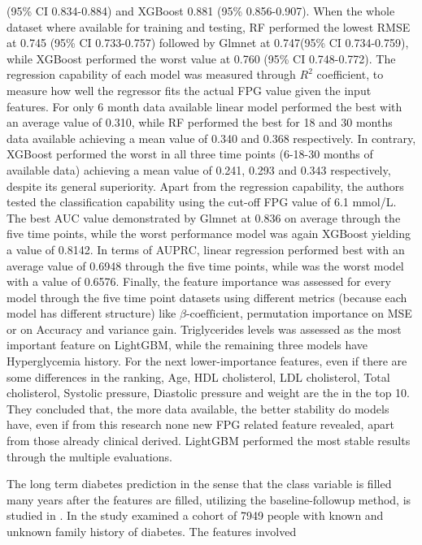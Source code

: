 \documentclass[journal,article,submit,pdftex,moreauthors]{Definitions/mdpi}
\begin{document}
(95\% CI 0.834-0.884) and XGBoost 0.881 (95\% 0.856-0.907). When the whole dataset
where available for training and testing, RF performed the lowest RMSE at 0.745 
(95\% CI 0.733-0.757) followed by Glmnet at 0.747(95\% CI 0.734-0.759), while 
XGBoost performed the worst value at 0.760 (95\% CI 0.748-0.772). The regression 
capability of each model was measured through $R^{2}$ coefficient, to measure how
well the regressor fits the actual FPG value given the input features. For only 6 
month data available linear model performed the best with an average value of 
0.310, while RF performed the best for 18 and 30 months data available achieving a 
mean value of 0.340 and 0.368 respectively. In contrary, XGBoost performed the 
worst in all three time points (6-18-30 months of available data) achieving a mean
value of 0.241, 0.293 and 0.343 respectively, despite its general superiority. 
Apart from the regression capability, the authors tested the classification 
capability using the cut-off FPG value of 6.1 mmol/L. The best AUC value demonstrated
by Glmnet at 0.836 on average  through the five time points, while the worst 
performance model was again XGBoost yielding a value of 0.8142. In terms of AUPRC,
linear regression performed best with an average value of 0.6948 through the five
time points, while was the worst model with a value of 0.6576. Finally, the feature 
importance was assessed for every model through the five time point datasets
using different metrics (because each model has different structure) like 
$\beta \textrm{-coefficient}$, permutation importance on MSE or on Accuracy and 
variance gain. Triglycerides levels was assessed as the most important feature on
LightGBM, while the remaining  three models have Hyperglycemia history. For the
next lower-importance features, even if there are some differences in the ranking,
Age, HDL cholisterol, LDL cholisterol, Total cholisterol, Systolic pressure, Diastolic
pressure and weight are the in the top 10.  They concluded that, the more data 
available, the better stability do models have, even if from this research none
new FPG related feature revealed, apart from those already clinical derived. LightGBM
performed the most stable results through the multiple evaluations.
\par The long term diabetes prediction in the sense  that the class variable is filled
many years after the features are filled, utilizing the baseline-followup method, is 
studied in \cite{lindstrom, Dritsas}. In \cite{lindstrom} the study examined a cohort
of 7949 people with known and unknown family history of diabetes. The features involved
\end{document}
